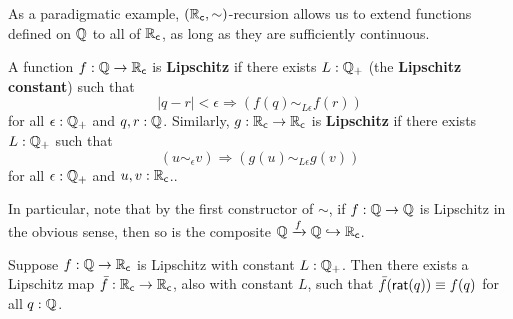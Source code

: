 As a paradigmatic example, $(\mathbb{R}_\mathsf{c},\sim)$-recursion allows us to extend functions defined on $\mathbb{Q}$ to all of $\mathbb{R}_\mathsf{c}$, as long as they are sufficiently continuous.

\begin{defn}\label{defn:lipschitz}
  A function $f:\mathbb{Q}\to\mathbb{R}_\mathsf{c}$ is \textbf{Lipschitz} if there exists $L:\mathbb{Q}_{+}$ (the \textbf{Lipschitz constant}) such that
  \[ |q - r|<\epsilon \Rightarrow (f(q) \sim_{L\epsilon} f(r)) \]
  for all $\epsilon:\mathbb{Q}_{+}$ and $q,r:\mathbb{Q}$.
  Similarly, $g:\mathbb{R}_\mathsf{c}\to\mathbb{R}_\mathsf{c}$ is \textbf{Lipschitz} if there exists $L:\mathbb{Q}_{+}$ such that
  \[ (u\sim_\epsilon v) \Rightarrow (g(u) \sim_{L\epsilon} g(v)) \]
  for all $\epsilon:\mathbb{Q}_{+}$ and $u,v:\mathbb{R}_\mathsf{c}$..
\end{defn}

In particular, note that by the first constructor of $\sim$, if $f:\mathbb{Q}\to\mathbb{Q}$ is Lipschitz in the obvious sense, then so is the composite $\mathbb{Q}\xrightarrow{f} \mathbb{Q} \hookrightarrow \mathbb{R}_\mathsf{c}$.

\begin{lem}\label{RC-extend-Q-Lipschitz}
  Suppose $f : \mathbb{Q} \to \mathbb{R}_\mathsf{c}$ is Lipschitz with constant $L : \mathbb{Q}_{+}$.
  Then there exists a Lipschitz map $\bar{f} : \mathbb{R}_\mathsf{c} \to \mathbb{R}_\mathsf{c}$, also with constant $L$, such that $\bar{f}(\mathsf{rat}(q)) \equiv f(q)$ for all $q:\mathbb{Q}$.
\end{lem}

